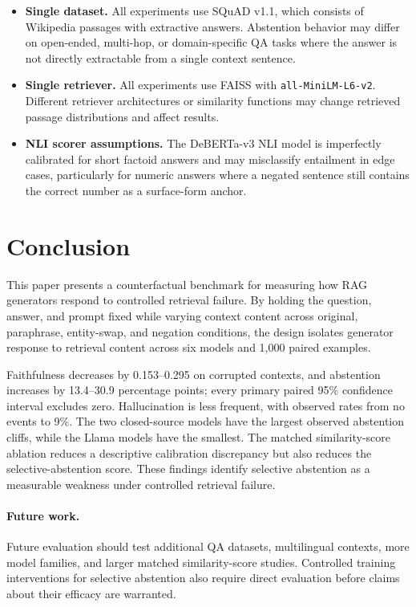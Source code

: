 \documentclass[11pt]{article}
\begin{document}
\begin{itemize}[noitemsep]
  \item \textbf{Single dataset.} All experiments use SQuAD v1.1, which consists of
    Wikipedia passages with extractive answers. Abstention behavior may differ on
    open-ended, multi-hop, or domain-specific QA tasks where the answer is not directly
    extractable from a single context sentence.

  \item \textbf{Single retriever.} All experiments use FAISS with
    \texttt{all-MiniLM-L6-v2}. Different retriever architectures or similarity functions
    may change retrieved passage distributions and affect results.

  \item \textbf{NLI scorer assumptions.} The DeBERTa-v3 NLI model is imperfectly
    calibrated for short factoid answers and may misclassify entailment in edge cases,
    particularly for numeric answers where a negated sentence still contains the correct
    number as a surface-form anchor.
\end{itemize}
\FloatBarrier
\section{Conclusion}
\label{sec:conclusion}

This paper presents a counterfactual benchmark for measuring how RAG generators respond
to controlled retrieval failure. By holding the question, answer, and prompt fixed while
varying context content across original, paraphrase, entity-swap, and negation conditions,
the design isolates generator response to retrieval content across six models and 1{,}000
paired examples.

Faithfulness decreases by 0.153--0.295 on corrupted contexts, and abstention increases by
13.4--30.9 percentage points; every primary paired 95\% confidence interval excludes
zero. Hallucination is less frequent, with observed rates from no events to 9\%.
The two closed-source models have the largest observed abstention cliffs, while the Llama
models have the smallest. The matched similarity-score ablation reduces a descriptive
calibration discrepancy but also reduces the selective-abstention score. These findings
identify selective abstention as a measurable weakness under controlled retrieval failure.

\paragraph{Future work.}
Future evaluation should test additional QA datasets, multilingual contexts, more model
families, and larger matched similarity-score studies. Controlled training interventions
for selective abstention also require direct evaluation before claims about their efficacy
are warranted.
\end{document}
